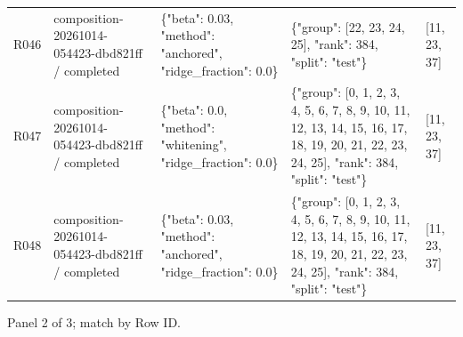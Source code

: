 \documentclass[10pt]{article}
\begin{document}
{\begin{longtable}{p{}p{}p{}p{}p{}}
R046 & composition-20261014-054423-dbd821ff / completed & \{"beta": 0.03, "method": "anchored", "ridge\_fraction": 0.0\} & \{"group": [22, 23, 24, 25], "rank": 384, "split": "test"\} & [11, 23, 37] \\
R047 & composition-20261014-054423-dbd821ff / completed & \{"beta": 0.0, "method": "whitening", "ridge\_fraction": 0.0\} & \{"group": [0, 1, 2, 3, 4, 5, 6, 7, 8, 9, 10, 11, 12, 13, 14, 15, 16, 17, 18, 19, 20, 21, 22, 23, 24, 25], "rank": 384, "split": "test"\} & [11, 23, 37] \\
R048 & composition-20261014-054423-dbd821ff / completed & \{"beta": 0.03, "method": "anchored", "ridge\_fraction": 0.0\} & \{"group": [0, 1, 2, 3, 4, 5, 6, 7, 8, 9, 10, 11, 12, 13, 14, 15, 16, 17, 18, 19, 20, 21, 22, 23, 24, 25], "rank": 384, "split": "test"\} & [11, 23, 37] \\
\end{longtable}}
\par\noindent Panel 2 of 3; match by Row ID.
\end{document}
